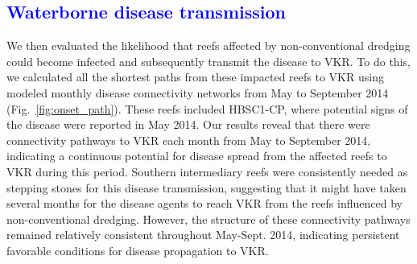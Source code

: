 \documentclass[preprint,12pt,authoryear]{elsarticle}
\newcommand{\modif}[1]{\textcolor{blue}{#1}}
\begin{document}
\modif{\subsection{Waterborne disease transmission}}
We then evaluated the likelihood that reefs affected by non-conventional dredging could become infected and subsequently transmit the disease to VKR. To do this, we calculated all the shortest paths from these impacted reefs to VKR using modeled monthly disease connectivity networks from May to September 2014 (Fig.~\ref{fig:onset_path}). These reefs included HBSC1-CP, where potential signs of the disease were reported in May 2014. Our results reveal that there were connectivity pathways to VKR each month from May to September 2014, indicating a continuous potential for disease spread from the affected reefs to VKR during this period. Southern intermediary reefs were consistently needed as stepping stones for this disease transmission, suggesting that it might have taken several months for the disease agents to reach VKR from the reefs influenced by non-conventional dredging. However, the structure of these connectivity pathways remained relatively consistent throughout May-Sept. 2014, indicating persistent favorable conditions for disease propagation to VKR.
\end{document}
